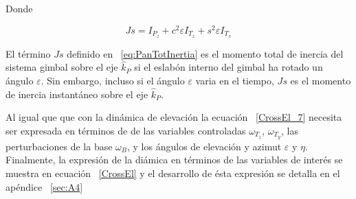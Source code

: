 Donde

\begin{equation}
Js=I_{P_z} + c^2 \varepsilon I_{T_z} + s^2 \varepsilon I_{T_x}
\label{eq:PanTotInertia}
\end{equation}

El t\'{e}rmino $Js$ definido en ~\ref{eq:PanTotInertia} es el momento total de inercia del sistema gimbal sobre el eje $\hat{k}_P$ si el eslab\'{o}n interno del gimbal ha rotado un \'{a}ngulo $\varepsilon$. Sin embargo, incluso si el \'{a}ngulo $\varepsilon$ varia en el tiempo, $Js$ es el momento de inercia instant\'{a}neo sobre el eje $\hat{k}_P$.

Al igual que que con la din\'{a}mica de elevaci\'{o}n la ecuaci\'{o}n ~\ref{CrossEl_7} necesita ser expresada en t\'{e}rminos de de las variables controladas $\omega_{T_z}$, $\omega_{T_y}$, las perturbaciones de la base $\omega_{B}$, y los \'{a}ngulos de elevaci\'{o}n y azimut $\varepsilon$ y $\eta$. Finalmente, la expresi\'{o}n de la di\'{a}mica en t\'{e}rminos de las variables de inter\'{e}s se muestra en ecuaci\'{o}n ~\ref{CrossEl} y el desarrollo de \'{e}sta expresi\'{o}n se detalla en el ap\'{e}ndice ~\ref{sec:A4}

